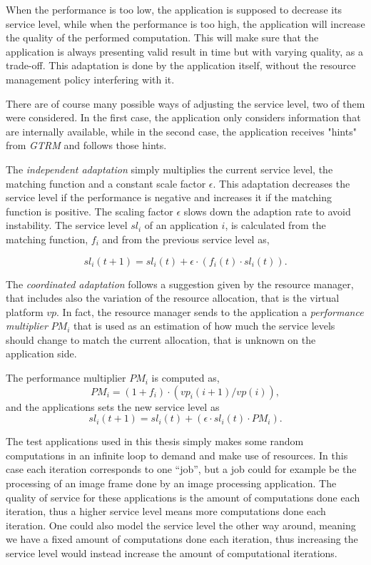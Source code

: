 \documentclass[nobiblatex]{LTHthesis}
\begin{document}
When the performance is too low, the application is supposed to decrease its
service level, while when the performance is too high, the application will
increase the quality of the performed computation. This will make sure that
the application is always presenting valid result in time but with varying
quality, as a trade-off. This adaptation is done by the application itself,
without the resource management policy interfering with it.

There are of course many possible ways of adjusting the service level, two of them were considered.
In the first case, the application only considers information that are
internally available, while in the second case, the application receives
"hints" from \emph{GTRM} and follows those hints.

The \emph{independent adaptation} simply multiplies the current service level,
the matching function and a constant scale factor $\epsilon$. This adaptation
decreases the service level if the performance is negative and increases it 
if the matching function is positive. The scaling factor $\epsilon$ slows 
down the adaption rate to avoid instability. The service level $sl_i$ of an application $i$, is calculated from the matching function, $f_i$ and from the previous service level as,

\begin{equation}
sl_i(t+1)= sl_i(t) + \epsilon \cdot (f_i(t) \cdot sl_i(t)).
\label{eq:simple_sl_rec}
\end{equation}

The \emph{coordinated adaptation} follows a suggestion given by the resource
manager, that includes also the variation of the resource allocation, that is the virtual platform $vp$. In fact,
the resource manager sends to the application a \emph{performance multiplier}
$PM_i$ that is used as an estimation of how much the service levels should
change to match the current allocation, that is unknown on the application
side.

The performance multiplier $PM_i$ is computed as,
\begin{equation}
PM_i = (1+f_i) \cdot (vp_i(i+1)/vp(i)),
\end{equation}
and the applications sets the new service level as
\begin{equation}
sl_i(t+1) = sl_i(t) + (\epsilon \cdot sl_i(t) \cdot PM_i).
\end{equation}

The test applications used in this thesis simply makes some random
computations in an infinite loop to demand and make use of resources. In this
case each iteration corresponds to one ``job'', but a job could for example
be the processing of an image frame done by an image processing application.
The quality of service for these applications is the amount of computations
done each iteration, thus a higher service level means more computations done 
each iteration. One could also model the service level the other way around,
meaning we have a fixed amount of computations done each iteration, thus
increasing the service level would instead increase the amount of
computational iterations.
\end{document}
